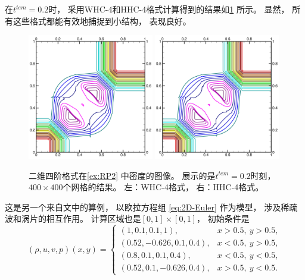 在$t^{tem}=0.2$时，
采用WHC-4和HHC-4格式计算得到的结果如\cref{fig:RP2} 所示。
显然，
所有这些格式都能有效地捕捉到小结构，
表现良好。

\begin{figure}[htbp]
  \centering
  \includegraphics[width=0.49\textwidth]{fig/2D/RP14_S2O4-WHC4_CFL0.600000.pdf}
  \includegraphics[width=0.49\textwidth]{fig/2D/RP14_S2O4-HHC4theta20_CFL0.600000.pdf}
  \caption{二维四阶格式在\cref{ex:RP2} 中密度的图像。
    展示的是$t^{tem}=0.2$时刻，
    \\$400 \times 400$个网格的结果。
    左：WHC-4格式，
    右：HHC-4格式。
  }
  \label{fig:RP2}
\end{figure}

\begin{example}[二维欧拉方程组的黎曼问题3]
  \label{ex:RP3}
  这是另一个来自文\cite{RPexample}中的算例，
  以欧拉方程组 \cref{eq:2D-Euler} 作为模型，
  涉及稀疏波和涡片的相互作用。
  计算区域也是$[0,1]\times[0,1]$，
  初始条件是
  \begin{equation}
    (\rho, u, v, p) (x, y)=
    \begin{cases}
      (1, 0.1, 0.1, 1),         & x>0.5,~y>0.5,  \\
      (0.52, -0.626, 0.1, 0.4), & x<0.5,~y>0.5,  \\
      (0.8, 0.1, 0.1, 0.4),     & x<0.5,~y<0.5,  \\
      (0.52, 0.1, -0.626, 0.4), & x>0.5,~y<0.5.
    \end{cases}
  \end{equation}
\end{example}

